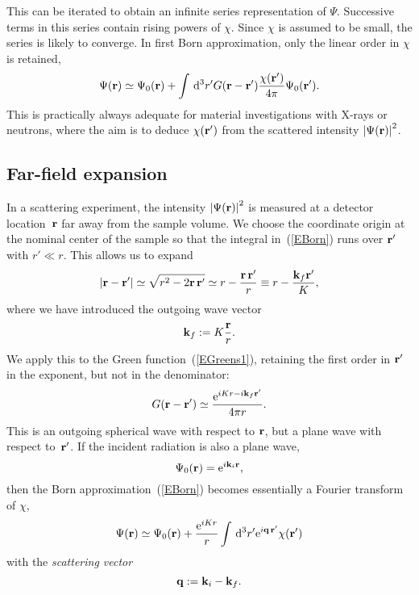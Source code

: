 This can be iterated to obtain an infinite series representation of $\Psi$.
Successive terms in this series contain rising powers of $\chi$.
Since $\chi$ is assumed to be small, the series is likely to converge.
In first Born approximation,
only the linear order in $\chi$ is retained,
\begin{equation}\label{EBorn}
  \Psi(\mathbf{r})
  \simeq \Psi_0(\mathbf{r})
  + \int\,{\rm d}^3r' G(\mathbf{r}-\mathbf{r'})\frac{\chi(\mathbf{r'})}{4\pi}
   \Psi_0(\mathbf{r'}).
\end{equation}
This is practically always adequate for
material investigations with X-rays or neutrons,
where the aim is to 
deduce $\chi(\mathbf{r'})$ from the scattered intensity ${|\Psi(\mathbf{r})|}^2$.

\subsection{Far-field expansion}

In a scattering experiment,
the intensity ${|\Psi(\mathbf{r})|}^2$ is measured
at a detector location~$\mathbf{r}$
far away from the sample volume.
We choose the coordinate origin at the nominal center of the sample
so that the integral in~(\ref{EBorn}) runs over $\mathbf{r'}$ with $r'\ll r$.
This allows us to expand
\begin{equation}
  \left|\mathbf{r}-\mathbf{r'}\right|
  \simeq \sqrt{r^2-2\mathbf{r}\,\mathbf{r'}}
  \simeq r - \frac{\mathbf{r}\,\mathbf{r'}}{r}
  \equiv r - \frac{\mathbf{k}_f \mathbf{r'}}{K},
\end{equation}
where we have introduced the outgoing wave vector
\begin{equation}
  \mathbf{k}_f:=K\frac{\mathbf{r}}{r}.
\end{equation}
We apply this to the Green function~(\ref{EGreens1}),
retaining the first order in $\mathbf{r'}$ in the exponent,
but not in the denominator:
\begin{equation}
  G(\mathbf{r}-\mathbf{r'})
  \simeq\frac{{\rm e}^{iKr - i\mathbf{k}_f \mathbf{r'}}}{4\pi r}.
\end{equation}
This is an outgoing spherical wave with respect to $\mathbf{r}$,
but a plane wave with respect to~$\mathbf{r'}$.
If the incident radiation is also a plane wave,
\begin{equation}\label{EPsi0Plane}
  \Psi_0(\mathbf{r})={\rm e}^{i \mathbf{k}_i \mathbf{r}},
\end{equation}
then the Born approximation~(\ref{EBorn})
becomes essentially a Fourier transform of $\chi$,
\begin{equation}\label{EBornPlane}
  \Psi(\mathbf{r})
  \simeq \Psi_0(\mathbf{r})
  + \frac{{\rm e}^{iKr}}{r}
    \int\,{\rm d}^3r' {\rm e}^{i\mathbf{q}\,\mathbf{r'}}\chi(\mathbf{r'})
\end{equation}
with the \textit{scattering vector}
\begin{equation}
  \mathbf{q}:=\mathbf{k}_i-\mathbf{k}_f.
\end{equation}

